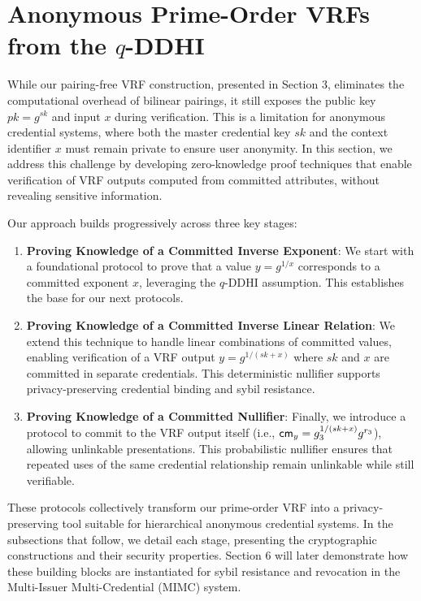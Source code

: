 \section{Anonymous Prime-Order VRFs from the $q$-DDHI}\label{sec:privacy-preserving-vrf}

While our pairing-free VRF construction, presented in Section 3, eliminates the computational overhead of bilinear pairings, it still exposes the public key $pk = g^{sk}$ and input $x$ during verification. This is a limitation for anonymous credential systems, where both the master credential key $sk$ and the context identifier $x$ must remain private to ensure user anonymity. In this section, we address this challenge by developing zero-knowledge proof techniques that enable verification of VRF outputs computed from committed attributes, without revealing sensitive information.

Our approach builds progressively across three key stages:

\begin{enumerate}
    \item \textbf{Proving Knowledge of a Committed Inverse Exponent}: We start with a foundational protocol to prove that a value $y = g^{1/x}$ corresponds to a committed exponent $x$, leveraging the $q$-DDHI assumption. This establishes the base for our next protocols.

    \item \textbf{Proving Knowledge of a Committed Inverse Linear Relation}: We extend this technique to handle linear combinations of committed values, enabling verification of a VRF output $y = g^{1/(sk + x)}$ where $sk$ and $x$ are committed in separate credentials. This deterministic nullifier supports privacy-preserving credential binding and sybil resistance.

    \item \textbf{Proving Knowledge of a Committed Nullifier}: Finally, we introduce a protocol to commit to the VRF output itself (i.e., $\mathsf{cm}_y = g_3^{1/(sk + x)} g^{r_3}$), allowing unlinkable presentations. This probabilistic nullifier ensures that repeated uses of the same credential relationship remain unlinkable while still verifiable.
\end{enumerate}

These protocols collectively transform our prime-order VRF into a privacy-preserving tool suitable for hierarchical anonymous credential systems. In the subsections that follow, we detail each stage, presenting the cryptographic constructions and their security properties. Section 6 will later demonstrate how these building blocks are instantiated for sybil resistance and revocation in the Multi-Issuer Multi-Credential (MIMC) system.














